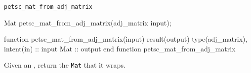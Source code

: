 \begin{boxwithtitle}{\texttt{petsc_mat_from_adj_matrix}}
\begin{minipage}{\columnwidth}
\begin{ccode}
  Mat petsc_mat_from_adj_matrix(adj_matrix input);
\end{ccode}
\begin{fortrancode}
  function petsc_mat_from_adj_matrix(input) result(output)
    type(adj_matrix), intent(in) :: input
    Mat :: output
  end function petsc_mat_from_adj_matrix
\end{fortrancode}
\end{minipage}
\end{boxwithtitle}
Given an , return the \texttt{Mat} that it wraps.
